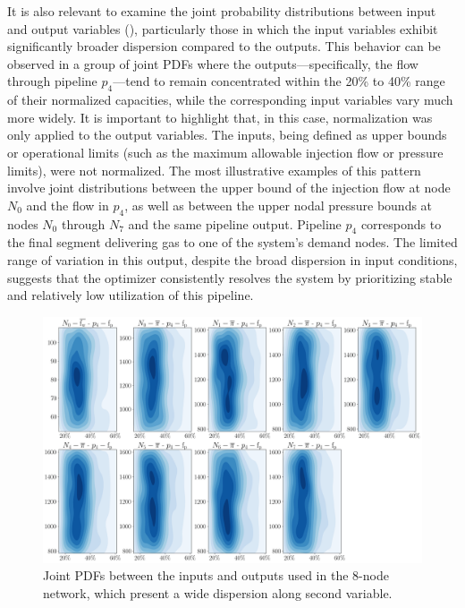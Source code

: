 It is also relevant to examine the joint probability distributions between input and output variables (), particularly those in which the input variables exhibit significantly broader dispersion compared to the outputs. This behavior can be observed in a group of joint PDFs where the outputs—specifically, the flow through pipeline $p_4$—tend to remain concentrated within the 20\% to 40\% range of their normalized capacities, while the corresponding input variables vary much more widely. It is important to highlight that, in this case, normalization was only applied to the output variables. The inputs, being defined as upper bounds or operational limits (such as the maximum allowable injection flow or pressure limits), were not normalized. The most illustrative examples of this pattern involve joint distributions between the upper bound of the injection flow at node $N_0$ and the flow in $p_4$, as well as between the upper nodal pressure bounds at nodes $N_0$ through $N_7$ and the same pipeline output. Pipeline $p_4$ corresponds to the final segment delivering gas to one of the system’s demand nodes. The limited range of variation in this output, despite the broad dispersion in input conditions, suggests that the optimizer consistently resolves the system by prioritizing stable and relatively low utilization of this pipeline. 


\begin{figure}[H]
    \begin{center}
        \includegraphics[width=.9\textwidth]{figures/Chapter_NonLinealCensnet/inputs_outputs_1.png}
    \end{center}
    \caption{Joint PDFs between the inputs and outputs used in the 8-node network, which present a wide dispersion along second variable. }
    \label{fig:joint_distributions_inputs_outputs_1}
\end{figure}

